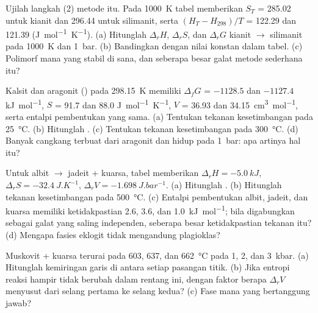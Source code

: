 \begin{exercise}[$\star\star$]\label{exo:b2:metamorphic-facies:6}
Ujilah langkah (2) metode itu. Pada \qty{1000}{K} tabel memberikan $S_T$ = 285.02 untuk kianit
dan 296.44 untuk silimanit, serta $(H_T - H_{298})/T$ = 122.29 dan 121.39
(\unit{J.mol^{-1}.K^{-1}}). (a) Hitunglah $\Delta_r H$, $\Delta_r S$, dan $\Delta_r G$
kianit $\to$ silimanit pada \qty{1000}{K} dan \qty{1}{bar}. (b) Bandingkan dengan nilai
konstan dalam tabel. (c) Polimorf mana yang stabil di sana, dan seberapa besar galat
metode sederhana itu?
\end{exercise}

\begin{exercise}[$\star\star$]\label{exo:b2:metamorphic-facies:7}
Kalsit dan aragonit () pada \qty{298.15}{K} memiliki $\Delta_f G$ = $-1128.5$ dan
$-1127.4$ \unit{kJ.mol^{-1}}, $S$ = 91.7 dan 88.0 \unit{J.mol^{-1}.K^{-1}}, $V$ = 36.93
dan \qty{34.15}{cm^3.mol^{-1}}, serta entalpi pembentukan yang sama. (a) Tentukan
tekanan kesetimbangan pada \qty{25}{\celsius}. (b) Hitunglah . (c) Tentukan
tekanan kesetimbangan pada \qty{300}{\celsius}. (d) Banyak cangkang terbuat dari aragonit dan
hidup pada \qty{1}{bar}: apa artinya hal itu?
\end{exercise}

\begin{exercise}[$\star\star$]\label{exo:b2:metamorphic-facies:8}
Untuk albit $\to$ jadeit + kuarsa, tabel memberikan $\Delta_r H = \qty{-5.0}{kJ}$,
$\Delta_r S = \qty{-32.4}{J.K^{-1}}$, $\Delta_r V = \qty{-1.698}{J.bar^{-1}}$. (a)
Hitunglah . (b) Hitunglah tekanan kesetimbangan pada \qty{500}{\celsius}.
(c) Entalpi pembentukan albit, jadeit, dan kuarsa memiliki ketidakpastian 2.6, 3.6,
dan \qty{1.0}{kJ.mol^{-1}}; bila digabungkan sebagai galat yang saling independen, seberapa besar ketidakpastian
tekanan itu? (d) Mengapa fasies eklogit tidak mengandung plagioklas?
\end{exercise}

\begin{exercise}[$\star\star$]\label{exo:b2:metamorphic-facies:9}
Muskovit + kuarsa terurai pada 603, 637, dan \qty{662}{\celsius} pada 1, 2, dan
\qty{3}{kbar}. (a) Hitunglah kemiringan garis di antara setiap pasangan titik. (b) Jika
entropi reaksi hampir tidak berubah dalam rentang ini, dengan faktor berapa $\Delta_r V$
menyusut dari selang pertama ke selang kedua? (c) Fase mana yang bertanggung jawab?
\end{exercise}

